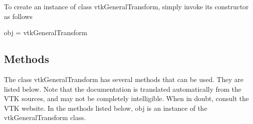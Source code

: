 To create an instance of class vtk\-General\-Transform, simply invoke its constructor as follows \begin{DoxyVerb}  obj = vtkGeneralTransform
\end{DoxyVerb}
 \hypertarget{vtkwidgets_vtkxyplotwidget_Methods}{}\subsection{Methods}\label{vtkwidgets_vtkxyplotwidget_Methods}
The class vtk\-General\-Transform has several methods that can be used. They are listed below. Note that the documentation is translated automatically from the V\-T\-K sources, and may not be completely intelligible. When in doubt, consult the V\-T\-K website. In the methods listed below, {\ttfamily obj} is an instance of the vtk\-General\-Transform class. 
